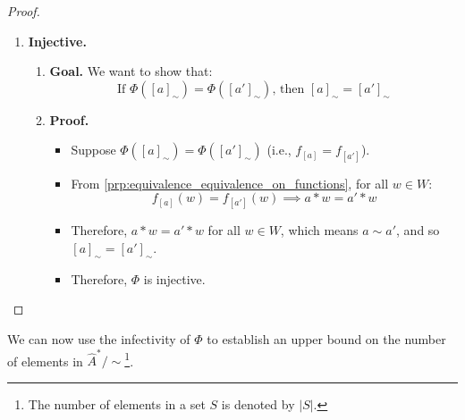 \begin{proof}
\begin{enumerate}
		\item \textbf{Injective.}
		      \begin{enumerate}
			      \item \textbf{Goal.}
			            We want to show that:
			            \begin{equation}
				            \text{If } \Phi([a]_{\sim}) = \Phi([a']_{\sim}) \text{, then } [a]_{\sim} = [a']_{\sim}
			            \end{equation}

			      \item \textbf{Proof.}
			            \begin{itemize}
				            \item Suppose $\Phi([a]_\sim) = \Phi([a']_\sim)$ (i.e., $f_{[a]} = f_{[a']}$).
				            \item From \ref{prp:equivalence_equivalence_on_functions}, for all $w \in W$:
				                  \begin{equation}
					                  f_{[a]}(w) = f_{[a']}(w) \implies a \ast w = a' \ast w
				                  \end{equation}
				            \item Therefore, $a \ast w = a' \ast w$ for all $w \in W$, which means $a \sim a'$, and so $[a]_{\sim} = [a']_{\sim}$.
				            \item Therefore, $\Phi$ is injective.
			            \end{itemize}
		      \end{enumerate}
	\end{enumerate}
\end{proof}


We can now use the infectivity of $\Phi$ to establish an upper bound on the number of elements in $\hat{A}^{\ast}/\sim$\footnote{The number of elements in a set $S$ is denoted by $|S|$.}.

